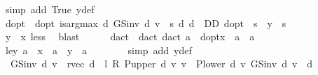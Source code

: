 \begin{isabellebody}
\ {\isacharparenleft}{\kern0pt}simp\ add{\isacharcolon}{\kern0pt}\ True\ y{\isacharunderscore}{\kern0pt}def{\isacharparenright}{\kern0pt}\isanewline
\ \ \ \ \isamarkupfalse%
\ d{\isacharunderscore}{\kern0pt}opt\ \ d{\isacharunderscore}{\kern0pt}opt{\isacharcolon}{\kern0pt}\ {\isachardoublequoteopen}is{\isacharunderscore}{\kern0pt}arg{\isacharunderscore}{\kern0pt}max\ {\isacharparenleft}{\kern0pt}{\isasymlambda}d{\isachardot}{\kern0pt}\ GS{\isacharunderscore}{\kern0pt}inv\ d\ v\ {\isachardollar}{\kern0pt}\ s{\isacharparenright}{\kern0pt}\ {\isacharparenleft}{\kern0pt}{\isasymlambda}d{\isachardot}{\kern0pt}\ d\ {\isasymin}\ D\isactrlsub D{\isacharparenright}{\kern0pt}\ d{\isacharunderscore}{\kern0pt}opt{\isachardoublequoteclose}\ \ {\isachardoublequoteopen}s\ {\isasymle}\ y{\isachardoublequoteclose}\ \ s\isanewline
\ \ \ \ \ \ \isamarkupfalse%
\ {\isacartoucheopen}y\ {\isacharless}{\kern0pt}\ x{\isacartoucheclose}\ less\ \isamarkupfalse%
\ blast\isanewline
\isanewline
\ \ \ \ \isamarkupfalse%
\ d{\isacharunderscore}{\kern0pt}act\ \ d{\isacharunderscore}{\kern0pt}act{\isacharcolon}{\kern0pt}\ {\isachardoublequoteopen}d{\isacharunderscore}{\kern0pt}act\ a\ {\isacharequal}{\kern0pt}\ d{\isacharunderscore}{\kern0pt}opt{\isacharparenleft}{\kern0pt}x\ {\isacharcolon}{\kern0pt}{\isacharequal}{\kern0pt}\ a{\isacharparenright}{\kern0pt}{\isachardoublequoteclose}\ \ a\isanewline
\ \ \ \ \isamarkupfalse%
\ le{\isacharunderscore}{\kern0pt}y{\isacharcolon}{\kern0pt}\ {\isachardoublequoteopen}a\ {\isacharless}{\kern0pt}\ x\ {\isasymLongrightarrow}\ a\ {\isasymle}\ y{\isachardoublequoteclose}\ \ a\isanewline
\ \ \ \ \ \ \isamarkupfalse%
\ {\isacharparenleft}{\kern0pt}simp\ add{\isacharcolon}{\kern0pt}\ y{\isacharunderscore}{\kern0pt}def{\isacharparenright}{\kern0pt}\isanewline
\ \ \ \ \isamarkupfalse%
\ {}{\isacharcolon}{\kern0pt}\ {\isachardoublequoteopen}GS{\isacharunderscore}{\kern0pt}inv\ d\ v\ {\isacharequal}{\kern0pt}\ r{\isacharunderscore}{\kern0pt}vec\ d\ {\isacharplus}{\kern0pt}\ l\ {\isacharasterisk}{\kern0pt}\isactrlsub R\ {\isacharparenleft}{\kern0pt}P{\isacharunderscore}{\kern0pt}upper\ d\ {\isacharasterisk}{\kern0pt}v\ v\ {\isacharplus}{\kern0pt}\ P{\isacharunderscore}{\kern0pt}lower\ d\ {\isacharasterisk}{\kern0pt}v\ {\isacharparenleft}{\kern0pt}GS{\isacharunderscore}{\kern0pt}inv\ d\ v{\isacharparenright}{\kern0pt}{\isacharparenright}{\kern0pt}{\isachardoublequoteclose}\ \ d\isanewline

\end{isabellebody}
